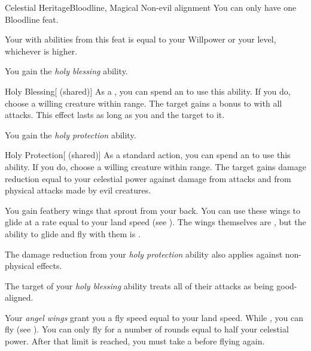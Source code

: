    \begin{feat}{Celestial Heritage}{Bloodline, Magical}
        \featpre Non-evil alignment
         You can only have one Bloodline feat.

         Your  with abilities from this feat is equal to your Willpower or your level, whichever is higher.

         You gain the \textit{holy blessing} ability.
        \begin{ability}{Holy Blessing}[ (shared)]
            As a , you can spend an  to use this ability.
            If you do, choose a willing creature within \rngclose range.
            The target gains a  bonus to  with all attacks.
            This effect lasts as long as you and the target  to it.
        \end{ability}

         You gain the \textit{holy protection} ability.
        \begin{ability}{Holy Protection}[ (shared)]
            As a standard action, you can spend an  to use this ability.
            If you do, choose a willing creature within \rngclose range.
            The target gains damage reduction equal to your celestial power against damage from  attacks and from physical attacks made by evil creatures.
        \end{ability}

         You gain feathery wings that sprout from your back.
        You can use these wings to glide at a rate equal to your land speed (see ).
        The wings themselves are , but the ability to glide and fly with them is .

         The damage reduction from your \textit{holy protection} ability also applies against non-physical effects.

         The target of your \textit{holy blessing} ability treats all of their attacks as being good-aligned.

         Your \textit{angel wings} grant you a fly speed equal to your land speed.
        While , you can fly (see ).
        You can only fly for a number of rounds equal to half your celestial power.
        After that limit is reached, you must take a  before flying again.


\end{feat}
